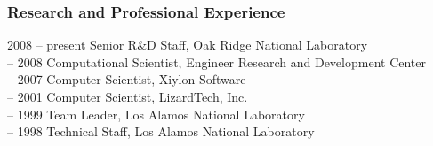 \subsubsection*{Research and Professional Experience}
\vspace*{-1ex}
\begin{tabbing}
  \hspace*{1ex} 
  \= 2008 -- present \hspace*{2ex} \= Senior R\&D Staff, Oak Ridge National Laboratory\\
   -- 2008 \> Computational Scientist, Engineer Research and Development Center\\
   -- 2007 \> Computer Scientist, Xiylon Software\\
   -- 2001 \> Computer Scientist, LizardTech, Inc.\\
   -- 1999 \> Team Leader, Los Alamos National Laboratory\\
   -- 1998 \> Technical Staff, Los Alamos National Laboratory\\
\end{tabbing}


\vspace*{-3ex}
